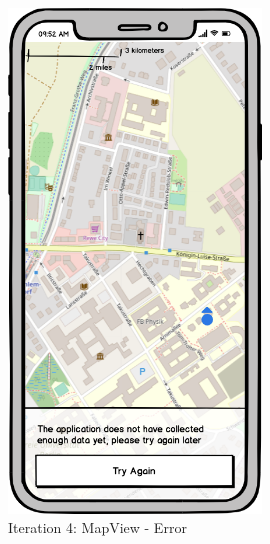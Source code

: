\begin{figure}[H]
\begin{minipage}[b]{0.45\textwidth}
    \includegraphics[width=0.6\textwidth]{images/UI/Iteration4-MapView-Error.png}
    \caption{Iteration 4: MapView - Error}
    \label{fig:i4-mv-error}
  \end{minipage}
\end{figure}

